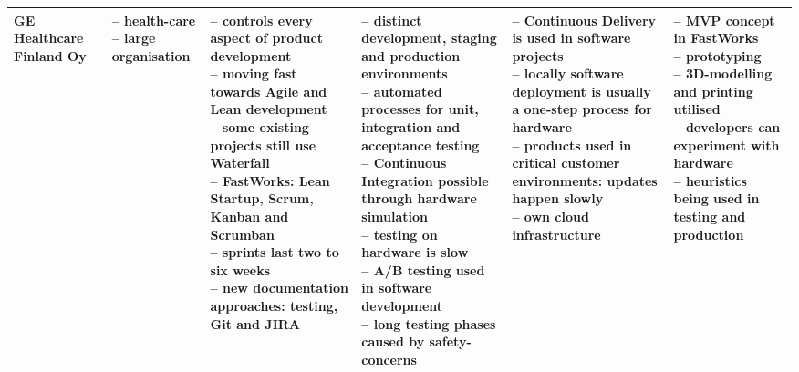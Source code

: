 \documentclass[english]{tktltiki2}
\begin{document}
\begin{landscape}
\begin{longtable}{|p{2.5cm}|p{1.5cm}|p{4cm}|p{4cm}|p{4cm}|p{4cm}|}
        GE Healthcare Finland Oy &
        \parbox[t]{1.5cm}{– health-care \\
                          – large organisation} &
        \parbox[t]{4cm}{– controls every aspect of product development \\
                        – moving fast towards Agile and Lean development \\
                        – some existing projects still use Waterfall \\
                        – FastWorks: Lean Startup, Scrum, Kanban and Scrumban \\
                        – sprints last two to six weeks \\
                        – new documentation approaches: testing, Git and JIRA} &
        \parbox[t]{4cm}{– distinct development, staging and production environments \\
                        – automated processes for unit, integration and acceptance testing \\
                        – Continuous Integration possible through hardware simulation \\
                        – testing on hardware is slow \\
                        – A/B testing used in software development \\
                        – long testing phases caused by safety-concerns} &
        \parbox[t]{4cm}{– Continuous Delivery is used in software projects \\
                        – locally software deployment is usually a one-step process for hardware \\
                        – products used in critical customer environments: updates happen slowly \\
                        – own cloud infrastructure} &
        \parbox[t]{4cm}{– MVP concept in FastWorks \\
                        – prototyping \\
                        – 3D-modelling and printing utilised \\
                        – developers can experiment with hardware \\
                        – heuristics being used in testing and production} \\

        \hline


\end{longtable}
\end{landscape}
\end{document}
